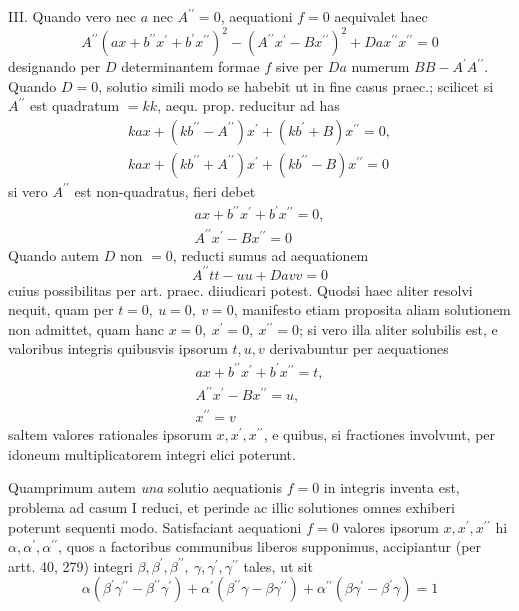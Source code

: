 III. Quando vero nec \(a\) nec \(A^{\prime\prime}=0\), aequationi \(f=0\) aequivalet haec 
\[A^{\prime\prime}(ax+b^{\prime\prime}x^\prime+b^\prime x^{\prime\prime})^2-(A^{\prime\prime}x^\prime-Bx^{\prime\prime})^2+Da x^{\prime\prime}x^{\prime\prime}=0\]
 designando per \(D\) determinantem formae \(f\) sive per \(Da\) numerum \(BB-A^\prime A^{\prime\prime}\). Quando \(D=0\), solutio simili modo se habebit ut in fine casus praec.; scilicet si \(A^{\prime\prime}\) est quadratum \(=kk\), aequ. prop. reducitur ad has 
\[\begin{gathered}kax+(kb^{\prime\prime}-A^{\prime\prime})x^\prime+(kb^\prime+B)x^{\prime\prime}=0,\\ kax+(kb^{\prime\prime}+A^{\prime\prime})x^\prime+(kb^{\prime\prime}-B)x^{\prime\prime}=0\end{gathered}\]
 si vero \(A^{\prime\prime}\) est non-quadratus, fieri debet 
\[\begin{gathered}ax+b^{\prime\prime}x^\prime+b^\prime x^{\prime\prime}=0,\\ A^{\prime\prime}x^\prime-Bx^{\prime\prime}=0\end{gathered}\]
 Quando autem \(D\) non \(=0\), reducti sumus ad aequationem 
\[A^{\prime\prime}tt-uu+Davv=0\]
 cuius possibilitas per art. praec. diiudicari potest. Quodsi haec aliter resolvi nequit, quam per \(t=0,\ u=0,\ v=0\), manifesto etiam proposita aliam solutionem non admittet, quam hanc \(x=0,\ x^\prime=0,\ x^{\prime\prime}=0\); si vero illa aliter solubilis est, e valoribus integris quibusvis ipsorum \(t,u,v\) derivabuntur per aequationes 
\[\begin{gathered}ax+b^{\prime\prime}x^\prime+b^\prime x^{\prime\prime}=t,\\ A^{\prime\prime}x^\prime-Bx^{\prime\prime}=u,\\ x^{\prime\prime}=v\end{gathered}\]
 saltem valores rationales ipsorum \(x,x^\prime,x^{\prime\prime}\), e quibus, si fractiones involvunt, per idoneum multiplicatorem integri elici poterunt.

Quamprimum autem \textit{una} solutio aequationis \(f=0\) in integris inventa est, problema ad casum I reduci, et perinde ac illic solutiones omnes exhiberi poterunt sequenti modo. Satisfaciant aequationi \(f=0\) valores ipsorum \(x,x^\prime,x^{\prime\prime}\) hi \(\alpha,\alpha^\prime,\alpha^{\prime\prime}\), quos a factoribus communibus liberos supponimus, accipiantur (per artt. 40, 279) integri \(\beta,\beta^\prime,\beta^{\prime\prime},\ \gamma,\gamma^\prime,\gamma^{\prime\prime}\) tales, ut sit 
\[\alpha(\beta^\prime\gamma^{\prime\prime}-\beta^{\prime\prime}\gamma^\prime)+\alpha^\prime(\beta^{\prime\prime}\gamma-\beta\gamma^{\prime\prime})+\alpha^{\prime\prime}(\beta\gamma^\prime-\beta^\prime\gamma)=1\]

